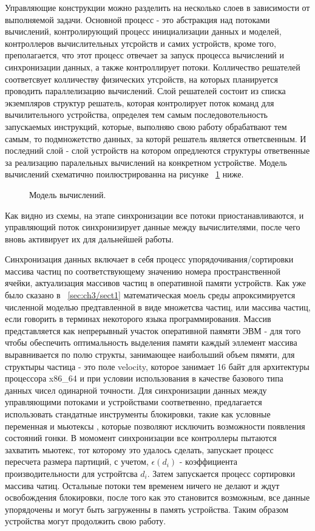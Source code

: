 Управляющие конструкции можно разделить на несколько слоев в зависимости от выполняемой задачи. Основной процесс - это абстракция над потоками вычислений, контролирующий процесс инициализации данных и моделей, контроллеров вычислительных утсройств и самих устройств, кроме того, преполагается, что этот процесс отвечает за запуск процесса вычислений и синхронизации данных, а также контроллирует потоки. Колличество решателей соответсвует колличеству физических утсройств, на которых планируется проводить параллелизацию вычислений. Слой решателей состоит из списка экземпляров структур решатель, которая контролирует поток команд для вычилительного устройства, определея тем самым последовотельность запускаемых инструкций, которые, выполняю свою работу обрабатвают тем самым, то подмножетство данных, за которй решатель является ответсвенным. И последний слой - слой устройств на котором опредлеются структуры ответвенные за реализацию паралельных вычислений на конкретном устройстве.
Модель вычислений схематично поилюстрированна на рисунке ~\ref{fig:calc1} ниже.
\begin{figure}[ht]
  \caption{Модель вычислений.}\label{fig:calc1}
\end{figure}

Как видно из схемы, на этапе синхронизации все потоки  приостанавливаются, и управляющий поток синхронизирует данные между вычислителями, после чего вновь активирует их для дальнейшей работы.

Синхронизация данных включает в себя процесс упорядочивания/сортировки массива частиц по соответствующему значению номера пространственной ячейки, актуализация массивов частиц в оперативной памяти устройств. Как уже было сказано в ~\ref{sec:ch3/sect1} математическая моель среды апроксимируется численной моделью предтавленной в виде множетсва частиц, или массива частиц, если говорить в терминах некоторого языка программирования. Массив представляется как непрерывный участок оперативной паямяти ЭВМ - для того чтобы обеспечить оптимальность выделения памяти каждый эллемент массива выравнивается по полю структы, занимающее наибольший объем пямяти, для структыры частица - это поле velocity, которое занимает 16 байт для архитектуры процессора x86\_64 и при условии использования в качестве базового типа данных чисел одинарной точности. Для синхронизации данных между управляющими потоками и устройствами соответвенно, предлагается использовать стандатные инструменты блокировки, такие как условные переменная и мьютексы \cite{Dijkstra1965}, которые позволяют исключить возможности появления состояний гонки. В момомент синхронизации все контроллеры пытаются захватить мьютекс, тот  которому это удалось сделать, запускает процесс пересчета размера партиций, с учетом, \(\epsilon(d_{i})\) - коэффициента производительности для устройтсва \(d_i\). Затем запускается процесс сортировки массива чатиц. Остальные потоки тем временем ничего не делают и ждут освобождения блокировки, после того как это становится возможным, все данные упорядочены и могут быть загруженны в память устройства. Таким образом устройства могут продолжить свою работу.

